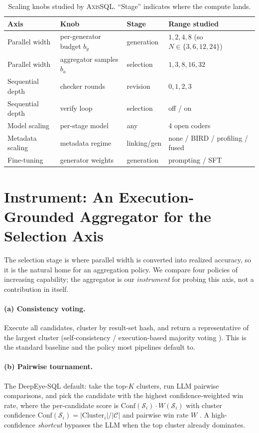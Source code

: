 \documentclass{article}
\newcommand{\sys}{\textsc{AxisSQL}\xspace}
\begin{document}
\begin{table}[t]
\centering
\small
\caption{Scaling knobs studied by \sys. ``Stage'' indicates where the compute lands.}
\label{tab:knobs}
\begin{tabular}{@{}llll@{}}
\toprule
\textbf{Axis} & \textbf{Knob} & \textbf{Stage} & \textbf{Range studied} \\
\midrule
Parallel width & per-generator budget $b_g$ & generation & $1,2,4,8$ (so $N\!\in\!\{3,6,12,24\}$) \\
Parallel width & aggregator samples $b_a$ & selection & $1,3,8,16,32$ \\
Sequential depth & checker rounds & revision & $0,1,2,3$ \\
Sequential depth & verify loop & selection & off / on \\
Model scaling & per-stage model & any & 4 open coders \\
Metadata scaling & metadata regime & linking/gen & none / BIRD / profiling / fused \\
Fine-tuning & generator weights & generation & prompting / SFT \\
\bottomrule
\end{tabular}
\end{table}

\section{Instrument: An Execution-Grounded Aggregator for the Selection Axis}
\label{sec:method}

The selection stage is where parallel width is converted into realized accuracy, so it is the natural home for an aggregation policy. We compare four policies of increasing capability; the aggregator is our \emph{instrument} for probing this axis, not a contribution in itself.

\paragraph{(a) Consistency voting.}
Execute all candidates, cluster by result-set hash, and return a representative of the largest cluster (self-consistency / execution-based majority voting \citep{wang2023selfconsistency}). This is the standard baseline and the policy most pipelines default to.

\paragraph{(b) Pairwise tournament.}
The DeepEye-SQL default: take the top-$K$ clusters, run LLM pairwise comparisons, and pick the candidate with the highest confidence-weighted win rate, where the per-candidate score is $\mathrm{Conf}(\mathcal{S}_i)\cdot W(\mathcal{S}_i)$ with cluster confidence $\mathrm{Conf}(\mathcal{S}_i)=|\text{Cluster}_i|/|\mathcal{C}|$ and pairwise win rate $W$ \citep{li2026deepeye}. A high-confidence \emph{shortcut} bypasses the LLM when the top cluster already dominates.
\end{document}

